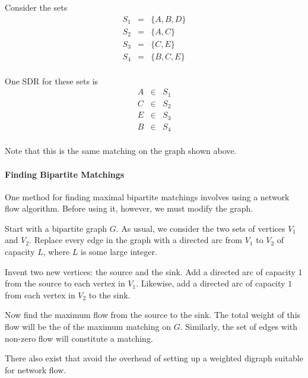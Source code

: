 \documentclass[12pt]{article}
\begin{document}
Consider the sets
\begin{eqnarray*}
S_1 &=& \{A, B, D\} \\
S_2 &=& \{A,C \} \\
S_3 &=& \{C,E \} \\
S_4 &=& \{B,C,E \} \\
\end{eqnarray*}

One SDR for these sets is
\begin{eqnarray*}
A &\in& S_1 \\
C &\in& S_2 \\
E &\in& S_3 \\
B &\in& S_4 \\
\end{eqnarray*}

Note that this is the same matching on the graph shown above.

\paragraph{Finding Bipartite Matchings}

One method for finding maximal bipartite matchings involves using a network flow algorithm.  Before using it, however, we must modify the graph.

Start with a bipartite graph $G$.  As usual, we consider the two sets of vertices $V_1$ and $V_2$.  Replace every edge in the graph with a directed arc from $V_1$ to $V_2$ of capacity $L$, where $L$ is some large integer.

Invent two new vertices: the source and the sink.  Add a directed arc of capacity $1$ from the source to each vertex in $V_1$.  Likewise, add a directed arc of capacity $1$ from each vertex in $V_2$ to the sink.

Now find the maximum flow from the source to the sink.  The total weight of this flow will be the  of the maximum matching on $G$.  Similarly, the set of edges with non-zero flow will constitute a matching.

There also exist  that avoid the overhead of setting up a weighted digraph suitable for network flow.
\end{document}
